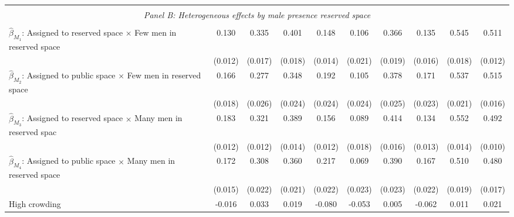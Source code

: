 \begin{tabular}{l*{9}{c}}
\hline \\[-1ex] \multicolumn{10}{c}{\textit{Panel B: Heterogeneous effects by male presence reserved space}} \\\\[-1ex]
$\hat\beta_{M_1}$: Assigned to reserved space $\times$ Few men in reserved space&       0.130\sym{***}&       0.335\sym{***}&       0.401\sym{***}&       0.148\sym{***}&       0.106\sym{***}&       0.366\sym{***}&       0.135\sym{***}&       0.545\sym{***}&       0.511\sym{***}\\
                    &     (0.012)         &     (0.017)         &     (0.018)         &     (0.014)         &     (0.021)         &     (0.019)         &     (0.016)         &     (0.018)         &     (0.012)         \\
[1em]
$\hat\beta_{M_2}$: Assigned to public space $\times$ Few men in reserved space&       0.166\sym{***}&       0.277\sym{***}&       0.348\sym{***}&       0.192\sym{***}&       0.105\sym{***}&       0.378\sym{***}&       0.171\sym{***}&       0.537\sym{***}&       0.515\sym{***}\\
                    &     (0.018)         &     (0.026)         &     (0.024)         &     (0.024)         &     (0.024)         &     (0.025)         &     (0.023)         &     (0.021)         &     (0.016)         \\
[1em]
$\hat\beta_{M_3}$: Assigned to reserved space $\times$ Many men in reserved spac&       0.183\sym{***}&       0.321\sym{***}&       0.389\sym{***}&       0.156\sym{***}&       0.089\sym{***}&       0.414\sym{***}&       0.134\sym{***}&       0.552\sym{***}&       0.492\sym{***}\\
                    &     (0.012)         &     (0.012)         &     (0.014)         &     (0.012)         &     (0.018)         &     (0.016)         &     (0.013)         &     (0.014)         &     (0.010)         \\
[1em]
$\hat\beta_{M_4}$: Assigned to public space $\times$ Many men in reserved space&       0.172\sym{***}&       0.308\sym{***}&       0.360\sym{***}&       0.217\sym{***}&       0.069\sym{***}&       0.390\sym{***}&       0.167\sym{***}&       0.510\sym{***}&       0.480\sym{***}\\
                    &     (0.015)         &     (0.022)         &     (0.021)         &     (0.022)         &     (0.023)         &     (0.023)         &     (0.022)         &     (0.019)         &     (0.017)         \\
[1em]
High crowding       &      -0.016         &       0.033         &       0.019         &      -0.080\sym{*}  &      -0.053         &       0.005         &      -0.062         &       0.011         &       0.021         \\

\end{tabular}
